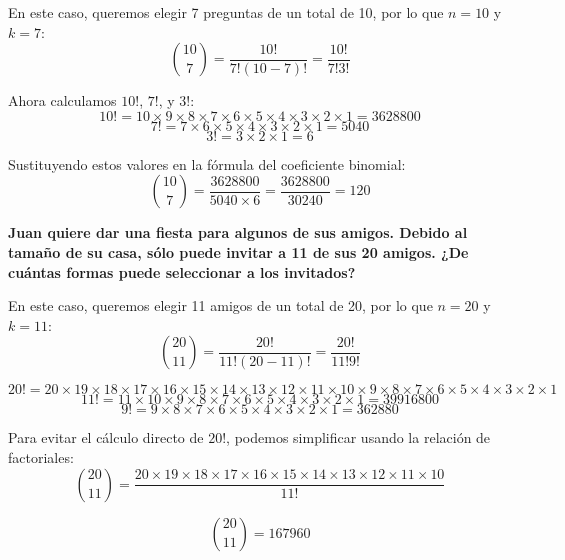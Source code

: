 \documentclass[answers]{exam} %
\begin{document}
\begin{questions}
\begin{solution}
        En este caso, queremos elegir 7 preguntas de un total de 10, por lo que \(n = 10\) y \(k = 7\):
        \[
            \binom{10}{7} = \frac{10!}{7!(10-7)!} = \frac{10!}{7!3!}
        \]

        Ahora calculamos \(10!\), \(7!\), y \(3!\):
        \[
            10! = 10 \times 9 \times 8 \times 7 \times 6 \times 5 \times 4 \times 3 \times 2 \times 1 = 3628800
        \]
        \[
            7! = 7 \times 6 \times 5 \times 4 \times 3 \times 2 \times 1 = 5040
        \]
        \[
            3! = 3 \times 2 \times 1 = 6
        \]

        Sustituyendo estos valores en la fórmula del coeficiente binomial:
        \[
            \binom{10}{7} = \frac{3628800}{5040 \times 6} = \frac{3628800}{30240} = 120
        \]

    \end{solution}

    \vspace{0.5cm}

    \question \large\textbf{Juan quiere dar una fiesta para algunos de sus amigos. Debido al tamaño de su casa, sólo puede invitar a 11 de sus 20 amigos. ¿De cuántas formas puede seleccionar a los invitados?}
    \begin{solution}
        En este caso, queremos elegir 11 amigos de un total de 20, por lo que \(n = 20\) y \(k = 11\):
        \[
            \binom{20}{11} = \frac{20!}{11!(20-11)!} = \frac{20!}{11!9!}
        \]

        \[
            20! = 20 \times 19 \times 18 \times 17 \times 16 \times 15 \times 14 \times 13 \times 12 \times 11 \times 10 \times 9 \times 8 \times 7 \times 6 \times 5 \times 4 \times 3 \times 2 \times 1
        \]
        \[
            11! = 11 \times 10 \times 9 \times 8 \times 7 \times 6 \times 5 \times 4 \times 3 \times 2 \times 1 = 39916800
        \]
        \[
            9! = 9 \times 8 \times 7 \times 6 \times 5 \times 4 \times 3 \times 2 \times 1 = 362880
        \]

        Para evitar el cálculo directo de \(20!\), podemos simplificar usando la relación de factoriales:
        \[
            \binom{20}{11} = \frac{20 \times 19 \times 18 \times 17 \times 16 \times 15 \times 14 \times 13 \times 12 \times 11 \times 10}{11!}
        \]


        \[
            \binom{20}{11} = 167960
        \]
    \end{solution}

    \vspace{0.5cm}



\end{questions}
\end{document}
